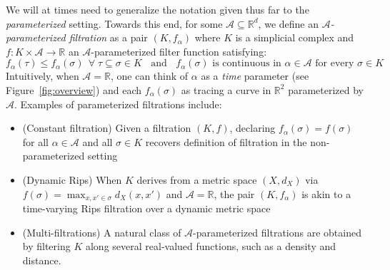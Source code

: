 We will at times need to generalize the notation given thus far to the \emph{parameterized} setting. Towards this end, for some $\mathcal{A} \subseteq \mathbb{R}^d$, we define an \emph{$\mathcal{A}$-parameterized filtration} as a pair $(K, f_\alpha)$ where $K$ is a simplicial complex and $f : K \times \mathcal{A} \to \mathbb{R}$ an $\mathcal{A}$-parameterized filter function satisfying:
\begin{equation}
f_\alpha(\tau) \leq f_\alpha(\sigma) \;\, \forall \; \tau \subseteq \sigma \in K  \;\; \text{ and } \; \; f_\alpha(\sigma) \text{ is continuous in } \alpha \in \mathcal{A} \text{ for every } \sigma \in K
\end{equation}
Intuitively, when $\mathcal{A} = \mathbb{R}$, one can think of $\alpha$ as a \emph{time} parameter (see Figure~\ref{fig:overview}) and each $f_\alpha(\sigma)$ as tracing a curve in $\mathbb{R}^2$ parameterized by $\mathcal{A}$.  
Examples of parameterized filtrations include:
\begin{itemize}[itemsep=0.25em, parsep=0.25em]
	\item (Constant filtration) Given a filtration $(K, f)$, declaring $f_\alpha(\sigma) = f(\sigma)$ for all $\alpha \in \mathcal{A}$ and all $\sigma \in K$ recovers definition of filtration in the non-parameterized setting
	\item (Dynamic Rips) When $K$ derives from a metric space $(X,d_X)$ via $f(\sigma) = \max_{x, x' \in \sigma} d_X(x,x')$ and $\mathcal{A} = \mathbb{R}$, the pair $(K, f_\alpha)$ is akin to a time-varying Rips filtration over a dynamic metric space~\cite{kim2021spatiotemporal}  
	\item (Multi-filtrations) A natural class of $\mathcal{A}$-parameterized filtrations are obtained by filtering $K$ along several real-valued functions, such as a density and distance.
\end{itemize} 


